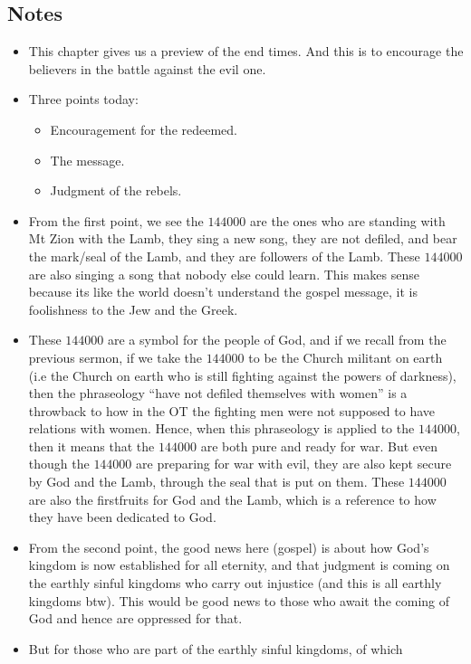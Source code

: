 \subsection*{Notes}
\begin{itemize}
  \item{This chapter gives us a preview of the end times. And this is to encourage the believers in the battle against the evil one.}
  \item{Three points today: 
  \begin{itemize}
    \item{Encouragement for the redeemed.}
    \item{The message.}
    \item{Judgment of the rebels.}
  \end{itemize}}
  \item{From the first point, we see the $144000$ are the ones who are
  standing with Mt Zion with the Lamb, they sing a new song, they are not
  defiled, and bear the mark/seal of the Lamb, and they are followers of the
  Lamb.  These $144000$ are also singing a song that nobody else could learn.
  This makes sense because its like the world doesn't understand the gospel
  message, it is foolishness to the Jew and the Greek.}
  \item{ These $144000$ are a symbol for the people of God, and if we recall
  from the previous sermon, if we take the $144000$ to be the Church militant
  on earth (i.e the Church on earth who is still fighting against the powers
  of darkness), then the phraseology ``have not defiled themselves with
  women'' is a throwback to how in the OT the fighting men were not supposed
  to have relations with women.  Hence, when this phraseology is applied to
  the $144000$, then it means that the $144000$ are both pure and ready for
  war.  But even though the $144000$ are preparing for war with evil, they
  are also kept secure by God and the Lamb, through the seal that is put on
  them.  These $144000$ are also the firstfruits for God and the Lamb, which
  is a reference to how they have been dedicated to God.  }
  \item{From the second point, the good news here (gospel) is about how God's
  kingdom is now established for all eternity, and that judgment is coming on
  the earthly sinful kingdoms who carry out injustice (and this is all
  earthly kingdoms btw).  This would be good news to those who await the
  coming of God and hence are oppressed for that.}
  \item{But for those who are part of the earthly sinful kingdoms, of which
}
\end{itemize}
